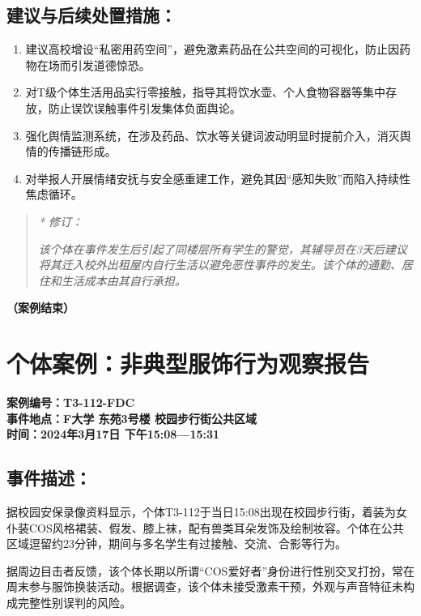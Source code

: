 \documentclass[]{ctexrep}
\begin{document}
	\subsection{建议与后续处置措施：}
	\begin{enumerate}
		\item 建议高校增设“私密用药空间”，避免激素药品在公共空间的可视化，防止因药物在场而引发道德惊恐。
		\item 对T级个体生活用品实行零接触，指导其将饮水壶、个人食物容器等集中存放，防止误饮误触事件引发集体负面舆论。
		\item 强化舆情监测系统，在涉及药品、饮水等关键词波动明显时提前介入，消灭舆情的传播链形成。
		\item 对举报人开展情绪安抚与安全感重建工作，避免其因“感知失败”而陷入持续性焦虑循环。
	\end{enumerate}
	\begin{quotation}
		\textit{\hspace{-4em} * 修订：}
		
		\textit{该个体在事件发生后引起了同楼层所有学生的警觉，其辅导员在3天后建议将其迁入校外出租屋内自行生活以避免恶性事件的发生。该个体的通勤、居住和生活成本由其自行承担。}
	\end{quotation}
	\begin{flushright}
		\textbf{（案例结束）}
	\end{flushright}
	
	\section{个体案例：非典型服饰行为观察报告}
	\label{案例3.3}
	\begin{center}
		\textbf{案例编号：T3-112-FDC\\
	事件地点：F大学 东苑3号楼 校园步行街公共区域\\
	时间：2024年3月17日 下午15:08—15:31}
	\end{center}
	\subsection{事件描述：}
	据校园安保录像资料显示，个体T3-112于当日15:08出现在校园步行街，着装为女仆装COS风格裙装、假发、膝上袜，配有兽类耳朵发饰及绘制妆容。个体在公共区域逗留约23分钟，期间与多名学生有过接触、交流、合影等行为。
	
	据周边目击者反馈，该个体长期以所谓“COS爱好者”身份进行性别交叉打扮，常在周末参与服饰换装活动。根据调查，该个体未接受激素干预，外观与声音特征未构成完整性别误判的风险。
	
\end{document}
